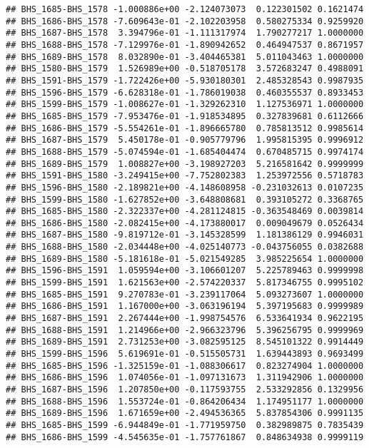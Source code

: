\documentclass[]{article}
\begin{document}
\begin{verbatim}
## BHS_1685-BHS_1578 -1.000886e+00 -2.124073073  0.122301502 0.1621474
## BHS_1686-BHS_1578 -7.609643e-01 -2.102203958  0.580275334 0.9259920
## BHS_1687-BHS_1578  3.394796e-01 -1.111317974  1.790277217 1.0000000
## BHS_1688-BHS_1578 -7.129976e-01 -1.890942652  0.464947537 0.8671957
## BHS_1689-BHS_1578  8.032890e-01 -3.404465381  5.011043463 1.0000000
## BHS_1580-BHS_1579  1.526989e+00 -0.518705178  3.572683247 0.4988091
## BHS_1591-BHS_1579 -1.722426e+00 -5.930180301  2.485328543 0.9987935
## BHS_1596-BHS_1579 -6.628318e-01 -1.786019038  0.460355537 0.8933453
## BHS_1599-BHS_1579 -1.008627e-01 -1.329262310  1.127536971 1.0000000
## BHS_1685-BHS_1579 -7.953476e-01 -1.918534895  0.327839681 0.6112666
## BHS_1686-BHS_1579 -5.554261e-01 -1.896665780  0.785813512 0.9985614
## BHS_1687-BHS_1579  5.450178e-01 -0.905779796  1.995815395 0.9996912
## BHS_1688-BHS_1579 -5.074594e-01 -1.685404474  0.670485715 0.9974174
## BHS_1689-BHS_1579  1.008827e+00 -3.198927203  5.216581642 0.9999999
## BHS_1591-BHS_1580 -3.249415e+00 -7.752802383  1.253972556 0.5718783
## BHS_1596-BHS_1580 -2.189821e+00 -4.148608958 -0.231032613 0.0107235
## BHS_1599-BHS_1580 -1.627852e+00 -3.648808681  0.393105272 0.3368765
## BHS_1685-BHS_1580 -2.322337e+00 -4.281124815 -0.363548469 0.0039814
## BHS_1686-BHS_1580 -2.082415e+00 -4.173880017  0.009049679 0.0526434
## BHS_1687-BHS_1580 -9.819712e-01 -3.145328599  1.181386129 0.9946031
## BHS_1688-BHS_1580 -2.034448e+00 -4.025140773 -0.043756055 0.0382688
## BHS_1689-BHS_1580 -5.181618e-01 -5.021549285  3.985225654 1.0000000
## BHS_1596-BHS_1591  1.059594e+00 -3.106601207  5.225789463 0.9999998
## BHS_1599-BHS_1591  1.621563e+00 -2.574220337  5.817346755 0.9995102
## BHS_1685-BHS_1591  9.270783e-01 -3.239117064  5.093273607 1.0000000
## BHS_1686-BHS_1591  1.167000e+00 -3.063196194  5.397195683 0.9999989
## BHS_1687-BHS_1591  2.267444e+00 -1.998754576  6.533641934 0.9622195
## BHS_1688-BHS_1591  1.214966e+00 -2.966323796  5.396256795 0.9999969
## BHS_1689-BHS_1591  2.731253e+00 -3.082595125  8.545101322 0.9914449
## BHS_1599-BHS_1596  5.619691e-01 -0.515505731  1.639443893 0.9693499
## BHS_1685-BHS_1596 -1.325159e-01 -1.088306617  0.823274904 1.0000000
## BHS_1686-BHS_1596  1.074056e-01 -1.097131673  1.311942906 1.0000000
## BHS_1687-BHS_1596  1.207850e+00 -0.117593755  2.533292856 0.1329956
## BHS_1688-BHS_1596  1.553724e-01 -0.864206434  1.174951177 1.0000000
## BHS_1689-BHS_1596  1.671659e+00 -2.494536365  5.837854306 0.9991135
## BHS_1685-BHS_1599 -6.944849e-01 -1.771959750  0.382989875 0.7835439
## BHS_1686-BHS_1599 -4.545635e-01 -1.757761867  0.848634938 0.9999119

\end{verbatim}
\end{document}
